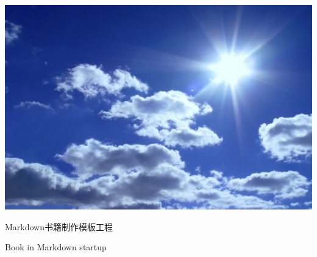 \documentclass{article}
\begin{document}
\centering
\includegraphics[angle=180,
width=1\textwidth]{cover}

\fontsize{60}{20}
\vspace{14em}

Markdown书籍制作模板工程

Book in Markdown startup
\end{document}
